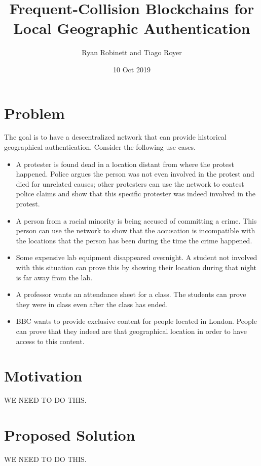 \documentclass{article}
\title{Frequent-Collision Blockchains for Local Geographic Authentication}
\author{Ryan Robinett and Tiago Royer}
\date{10 Oct 2019}
\begin{document}
\maketitle

\section*{Problem}

The goal is to have a descentralized network
that can provide historical geographical authentication.
Consider the following use cases.

\begin{itemize}
	\item A protester is found dead in a location distant from where the protest happened.
		Police argues the person was not even involved in the protest
		and died for unrelated causes;
		other protesters can use the network to contest police claims
		and show that this specific protester was indeed involved in the protest.

	\item A person from a racial minority is being accused of committing a crime.
		This person can use the network to show that the accusation
		is incompatible with the locations that the person has been
		during the time the crime happened.

	\item Some expensive lab equipment disappeared overnight.
		A student not involved with this situation
		can prove this by showing their location during that night
		is far away from the lab.

	\item A professor wants an attendance sheet for a class.
		The students can prove they were in class
		even after the class has ended.

	\item BBC wants to provide exclusive content for people located in London.
		People can prove that they indeed are that geographical location
		in order to have access to this content.
\end{itemize}


\section*{Motivation}
WE NEED TO DO THIS.

\section*{Proposed Solution}
WE NEED TO DO THIS.
\end{document}
